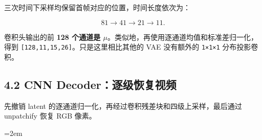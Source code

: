\documentclass[
  11pt,
  a4paper,
  fontset=none]{ctexart}
\newcommand{\NotesTableStyle}{\linespread{1}\fontsize{9.5pt}{13pt}\selectfont\setlength{\tabcolsep}{4pt}\renewcommand{\arraystretch}{1.1}\setlength{\extrarowheight}{5pt}\setlength{\LTpre}{5pt}\setlength{\LTpost}{6pt}\setlength{\parskip}{0pt}\emergencystretch=2em}
\begin{document}
\endgroup

三次时间下采样均保留首帧对应的位置，时间长度依次为：

\[
81\rightarrow41\rightarrow21\rightarrow11.
\]

卷积头输出的前 \textbf{128 个通道是
\(\mu\)}。类似地，再使用逐通道均值和标准差归一化，得到
\texttt{{[}128,11,15,26{]}}。只是这里相比其他的 VAE 没有额外的
\texttt{1×1×1} 分布投影卷积。

\clearpage

\subsection{4.2 CNN Decoder：逐级恢复视频}\label{ltx25-conv-decoder}

先撤销 latent 的逐通道归一化，再经过卷积残差块和四级上采样，最后通过
unpatchify 恢复 RGB 像素。

\begingroup\NotesTableStyle\fontsize{10.5pt}{14pt}\selectfont\renewcommand{\arraystretch}{1.08}\setlength{\extrarowheight}{3pt}
\end{document}
